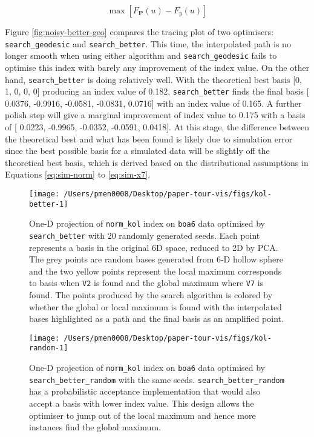 \documentclass[12pt]{article}
\begin{document}
\[\max \left[F_{\mathbf{P}}(u) - F_{y}(u)\right]\]

Figure \ref{fig:noisy-better-geo} compares the tracing plot of two optimisers: \texttt{search\_geodesic} and \texttt{search\_better}. This time, the interpolated path is no longer smooth when using either algorithm and \texttt{search\_geodesic} fails to optimise this index with barely any improvement of the index value. On the other hand, \texttt{search\_better} is doing relatively well. With the theoretical best basis {[}0, 1, 0, 0, 0{]} producing an index value of 0.182, \texttt{search\_better} finds the final basis {[} 0.0376, -0.9916, -0.0581, -0.0831, 0.0716{]} with an index value of 0.165. A further polish step will give a marginal improvement of index value to 0.175 with a basis of {[} 0.0223, -0.9965, -0.0352, -0.0591, 0.0418{]}. At this stage, the difference between the theoretical best and what has been found is likely due to simulation error since the best possible basis for a simulated data will be slightly off the theoretical best basis, which is derived based on the distributional assumptions in Equations \ref{eq:sim-norm} to \ref{eq:sim-x7}.

\begin{figure}

{\centering \texttt{[image: /Users/pmen0008/Desktop/paper-tour-vis/figs/kol-better-1]} 

}

\caption{One-D projection of \texttt{norm\_kol} index on \texttt{boa6} data optimised by \texttt{search\_better} with 20 randomly generated seeds. Each point represents a basis in the original 6D space, reduced to 2D by PCA. The grey points are random bases generated from 6-D hollow sphere and the two yellow points represent the local maximum corresponds to basis when \texttt{V2} is found and the global maximum where \texttt{V7} is found. The points produced by the search algorithm is colored by whether the global or local maximum is found with the interpolated bases highlighted as a path and the final basis as an amplified point.}\label{fig:kol-better}
\end{figure}



\begin{figure}

{\centering \texttt{[image: /Users/pmen0008/Desktop/paper-tour-vis/figs/kol-random-1]} 

}

\caption{One-D projection of \texttt{norm\_kol} index on \texttt{boa6} data optimised by \texttt{search\_better\_random} with the same seeds. \texttt{search\_better\_random} has a probabilistic acceptance implementation that would also accept a basis with lower index value. This design allows the optimiser to jump out of the local maximum and hence more instances find the global maximum.}\label{fig:kol-random}
\end{figure}
\end{document}
